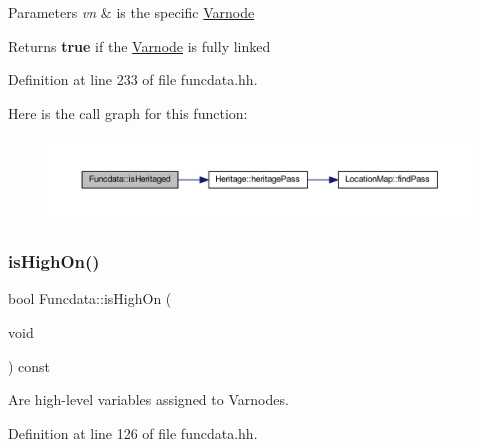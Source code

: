\begin{DoxyParams}{Parameters}
{\em vn} & is the specific \mbox{\hyperlink{class_varnode}{Varnode}} \\
\hline
\end{DoxyParams}
\begin{DoxyReturn}{Returns}
{\bfseries{true}} if the \mbox{\hyperlink{class_varnode}{Varnode}} is fully linked 
\end{DoxyReturn}


Definition at line 233 of file funcdata.\+hh.

Here is the call graph for this function\+:
\nopagebreak
\begin{figure}[H]
\begin{center}
\leavevmode
\includegraphics[width=350pt]{class_funcdata_a803cbb38fe59825f59858a16afa54b7d_cgraph}
\end{center}
\end{figure}
\mbox{\label{class_funcdata_a624dc32b7a1a0563bae734de63378139}} 
\subsubsection{\texorpdfstring{isHighOn()}{isHighOn()}}
{\footnotesize\ttfamily bool Funcdata\+::is\+High\+On (\begin{DoxyParamCaption}\item[{void}]{ }\end{DoxyParamCaption}) const\hspace{0.3cm}{\ttfamily [inline]}}



Are high-\/level variables assigned to Varnodes. 



Definition at line 126 of file funcdata.\+hh.

